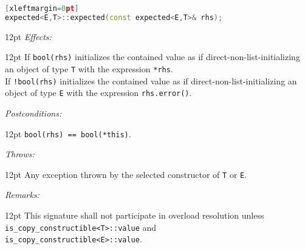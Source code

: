 \documentclass[a4paper,10pt]{article}
\newcommand{\cpp}[1]{\lstinline{#1}}
\newcommand{\wordingItem}[1]{\noindent\textit{#1:}}
\newenvironment{wordingTextItem}[1]{\wordingItem{#1}\vspace{2pt}\noindent\begin{adjustwidth}{12pt}{}}{\vspace{2pt}\end{adjustwidth}}
\newenvironment{wordingPara}{\begin{adjustwidth}{12pt}{}}{\end{adjustwidth}}
\begin{document}
\begin{lstlisting}[language=C++][xleftmargin=0pt]
expected<E,T>::expected(const expected<E,T>& rhs);
\end{lstlisting}
\begin{wordingPara}
\begin{wordingTextItem}{Effects}
If \cpp{bool(rhs)} initializes the contained value as if direct-non-list-initializing an object of type \cpp{T} with the expression \cpp{*rhs}.\\

\noindent
If \cpp{!bool(rhs)} initializes the contained value as if direct-non-list-initializing an object of type \cpp{E} with the expression \cpp{rhs.error()}.
\end{wordingTextItem}
\begin{wordingTextItem}{Postconditions}
\cpp{bool(rhs) == bool(*this)}.
\end{wordingTextItem}
\begin{wordingTextItem}{Throws}
Any exception thrown by the selected constructor of \cpp{T} or \cpp{E}.
\end{wordingTextItem}
\begin{wordingTextItem}{Remarks}
This signature shall not participate in overload resolution unless\\
\cpp{is_copy_constructible<T>::value} and\\
\cpp{is_copy_constructible<E>::value}.
\end{wordingTextItem}
\end{wordingPara}
\end{document}

